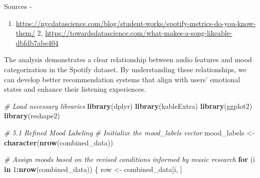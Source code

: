 \documentclass[
]{article}
\newenvironment{Shaded}{\begin{snugshade}}{\end{snugshade}}
\newcommand{\CommentTok}[1]{\textcolor[rgb]{0.56,0.35,0.01}{\textit{#1}}}
\newcommand{\ControlFlowTok}[1]{\textcolor[rgb]{0.13,0.29,0.53}{\textbf{#1}}}
\newcommand{\DecValTok}[1]{\textcolor[rgb]{0.00,0.00,0.81}{#1}}
\newcommand{\FunctionTok}[1]{\textcolor[rgb]{0.13,0.29,0.53}{\textbf{#1}}}
\newcommand{\NormalTok}[1]{#1}
\newcommand{\OtherTok}[1]{\textcolor[rgb]{0.56,0.35,0.01}{#1}}
\newcommand{\SpecialCharTok}[1]{\textcolor[rgb]{0.81,0.36,0.00}{\textbf{#1}}}
\providecommand{\tightlist}{%
  \setlength{\itemsep}{0pt}\setlength{\parskip}{0pt}}
\begin{document}
Sources -

\begin{enumerate}
\def\labelenumi{\arabic{enumi}.}
\tightlist
\item
  \url{https://nycdatascience.com/blog/student-works/spotify-metrics-do-you-know-them/}
  2,
  \url{https://towardsdatascience.com/what-makes-a-song-likeable-dbfdb7abe404}
\end{enumerate}

The analysis demonstrates a clear relationship between audio features
and mood categorization in the Spotify dataset. By understanding these
relationships, we can develop better recommendation systems that align
with users' emotional states and enhance their listening experiences.

\begin{Shaded}
\begin{Highlighting}[]
\CommentTok{\# Load necessary libraries}
\FunctionTok{library}\NormalTok{(dplyr)}
\FunctionTok{library}\NormalTok{(kableExtra)}
\FunctionTok{library}\NormalTok{(ggplot2)}
\FunctionTok{library}\NormalTok{(reshape2)}

\CommentTok{\# 5.1 Refined Mood Labeling}
\CommentTok{\# Initialize the mood\_labels vector}
\NormalTok{mood\_labels }\OtherTok{\textless{}{-}} \FunctionTok{character}\NormalTok{(}\FunctionTok{nrow}\NormalTok{(combined\_data))}

\CommentTok{\# Assign moods based on the revised conditions informed by music research}
\ControlFlowTok{for}\NormalTok{ (i }\ControlFlowTok{in} \DecValTok{1}\SpecialCharTok{:}\FunctionTok{nrow}\NormalTok{(combined\_data)) \{}
\NormalTok{  row }\OtherTok{\textless{}{-}}\NormalTok{ combined\_data[i, ]}
  

\end{Highlighting}
\end{Shaded}
\end{document}
